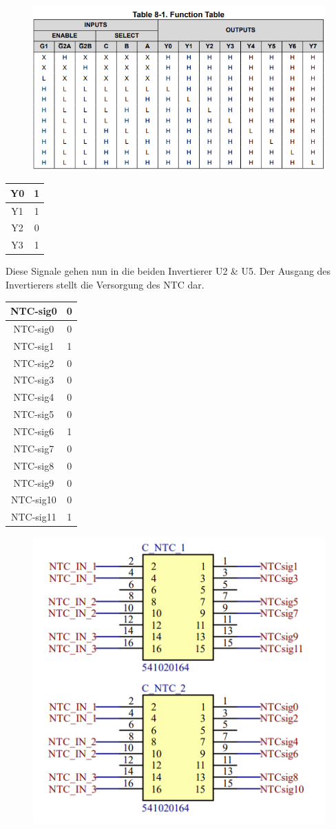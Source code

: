 \begin{figure}
	
	\centering
	\includegraphics[width=0.3\linewidth]{bilder/AMS_demuxer_logiktabelle}
	\caption{}
	\label{Demuxer_Logiktabelle}
	\label{fig:amsdemuxerlogiktabelle}
\end{figure}

\FloatBarrier
\begin{table}
	\centering
	\begin{tabular}{|c|c|}
		\hline
		Y0 & 1 \\
		\hline
		Y1 & 1 \\
		\hline
		Y2 & 0 \\
		\hline
		Y3 & 1 \\
		\hline
	\end{tabular}
\end{table}

Diese Signale gehen nun in die beiden Invertierer U2 \& U5. Der Ausgang des Invertierers stellt die Versorgung des NTC dar.
\begin{table}
	\centering
	\begin{tabular}{|c|c|}
		\hline
		NTC-sig0 & 0 \\
		\hline
		NTC-sig0 & 0 \\
		\hline
		NTC-sig1 & 1 \\
		\hline
		NTC-sig2 & 0 \\
		\hline
		NTC-sig3 & 0 \\
		\hline
		NTC-sig4 & 0 \\
		\hline
		NTC-sig5 & 0 \\
		\hline
		NTC-sig6 & 1 \\
		\hline
		NTC-sig7 & 0 \\
		\hline
		NTC-sig8 & 0 \\
		\hline
		NTC-sig9 & 0 \\
		\hline
		NTC-sig10 & 0 \\
		\hline
		NTC-sig11 & 1 \\
		\hline
	\end{tabular}
\end{table}

\begin{figure}
	\centering
	\includegraphics[width=0.3\linewidth]{bilder/AMS_NTC_steckerlayout}
	\caption{}
	\label{fig:amsntcsteckerlayout}
\end{figure}

